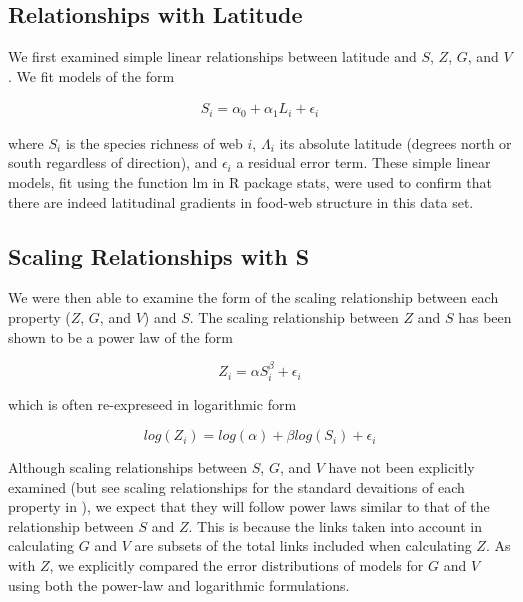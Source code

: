 \documentclass[12pt]{article}
\begin{document}
\subsection*{Relationships with Latitude}

We first examined simple linear relationships between latitude and $S$, $Z$, $G$, and $V$. We fit models of the form

\begin{eqnarray}
S_{i} = \alpha_{0} + \alpha_{1} L_{i} + \epsilon_{i} 
\end{eqnarray}

where $S_{i}$ is the species richness of web $i$, $\Lambda_{i}$ its absolute latitude (degrees north or south 
regardless of direction), and $\epsilon_{i}$ a residual error term.
These simple linear models, fit using the function lm in R \citep{R} package stats, were used to confirm that there are indeed latitudinal gradients in food-web structure in this data set.


\subsection*{Scaling Relationships with S}

We were then able to examine the form of the scaling relationship between each property ($Z$, $G$, and $V$) and $S$.
The scaling relationship between $Z$ and $S$ has been shown to be a power law \citep{Riede2010} of the form 

\begin{equation}
\label{Power}
Z_{i}=\alpha S_{i}^{\beta} + \epsilon_{i} 
\end{equation}

which is often re-expreseed in logarithmic form 

\begin{equation}
\label{Loglog}
log(Z_{i}) = log(\alpha) + \beta log(S_{i}) + \epsilon_{i}  
\end{equation}

Although scaling relationships between $S$, $G$, and $V$ have not been explicitly examined (but see scaling 
relationships for the standard devaitions of each property in \citet{Riede2010}), we expect that they will follow
power laws similar to that of the relationship between $S$ and $Z$. This is because the links taken into account in
calculating $G$ and $V$ are subsets of the total links included when calculating $Z$. As with $Z$, we explicitly 
compared the error distributions of models for $G$ and $V$ using both the power-law and logarithmic formulations. 
\end{document}
